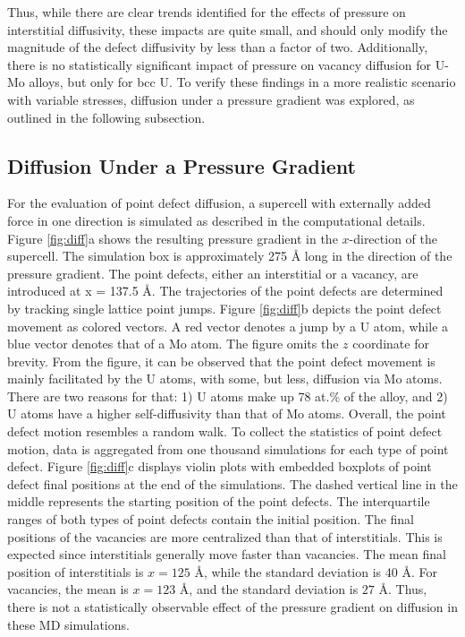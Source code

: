 \documentclass[review]{elsarticle}
\begin{document}
Thus, while there are clear trends identified for the effects of pressure on interstitial diffusivity, these impacts are quite small, and should only modify the magnitude of the defect diffusivity by less than a factor of two. Additionally, there is no statistically significant impact of pressure on vacancy diffusion for U-Mo alloys, but only for bcc U. To verify these findings in a more realistic scenario with variable stresses, diffusion under a pressure gradient was explored, as outlined in the following subsection. 

\FloatBarrier

\subsection{Diffusion Under a Pressure Gradient}

For the evaluation of point defect diffusion, a supercell with externally added force in one direction is simulated as described in the computational details. Figure \ref{fig:diff}a shows the resulting pressure gradient in the $x$-direction of the supercell. The simulation box is approximately 275 \r{A} long in the direction of the pressure gradient. The point defects, either an interstitial or a vacancy, are introduced at x = 137.5 \r{A}. The trajectories of the point defects are determined by tracking single lattice point jumps. Figure \ref{fig:diff}b depicts the point defect movement as colored vectors. A red vector denotes a jump by a U atom, while a blue vector denotes that of a Mo atom. The figure omits the $z$ coordinate for brevity. From the figure, it can be observed that the point defect movement is mainly facilitated by the U atoms, with some, but less, diffusion via Mo atoms. There are two reasons for that: 1) U atoms make up 78 at.\% of the alloy, and 2) U atoms have a higher self-diffusivity than that of Mo atoms. Overall, the point defect motion resembles a random walk. To collect the statistics of point defect motion, data is aggregated from one thousand simulations for each type of point defect. Figure \ref{fig:diff}c displays violin plots with embedded boxplots of point defect final positions at the end of the simulations. The dashed vertical line in the middle represents the starting position of the point defects. The interquartile ranges of both types of point defects contain the initial position. The final positions of the vacancies are more centralized than that of interstitials. This is expected since interstitials generally move faster than vacancies. The mean final position of interstitials is $x = 125$ \r{A}, while the standard deviation is $40$ \r{A}. For vacancies, the mean is $x = 123$ \r{A}, and the standard deviation is $27$ \r{A}. Thus, there is not a statistically observable effect of the pressure gradient on diffusion in these MD simulations. 
\end{document}
